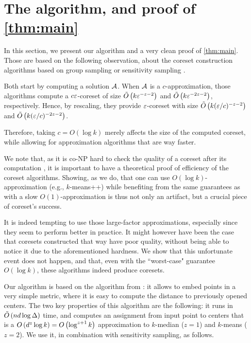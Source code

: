 \section{The algorithm, and proof of \cref{thm:main}}

In this section, we present our algorithm and a very clean proof of \cref{thm:main}. Those are based on the following observation, about the coreset construction algorithms based on group sampling \cite{stoc21} or sensitivity sampling \cite{FeldmanL11}. 

Both start by computing a solution $\mathcal A$. When $\mathcal A$ is a $c$-approximation, those algorithms compute a $c \varepsilon$-coreset of size $\tilde O\left( k \varepsilon^{-z-2}\right)$ and $\tilde O\left( k \varepsilon^{-2z -2}\right)$, respectively. Hence, by rescaling, they provide $\varepsilon$-coreset with size $\tilde O\left( k (\varepsilon/c)^{-z-2}\right)$ and $\tilde O\left( k (\varepsilon/c)^{-2z-2}\right)$. 

Therefore, taking $c = O(\log k)$ merely affects the size of the computed coreset, while allowing for approximation algorithms that are way faster.

We note that, as it is co-NP hard to check the quality of a coreset after its computation \cite{chrisESA}, it is important to have a theoretical proof of efficiency of the coreset algorithms. 
Showing, as we do, that one can use $O(\log k)$-approximation (e.g., $k$-means++) while benefiting from the same guarantees as with a slow $O(1)$-approximation is thus not only an artifact, but a crucial piece of coreset's success. 

It is indeed tempting to use those large-factor approximations, especially since they seem to perform better in practice. 
It might however have been the case that coresets constructed that way have poor quality, without being able to notice it due to the aforementioned hardness. 
We show that this unfortunate event does not happen, and that, even with the ``worst-case" guarantee $O(\log k)$, these algorithms indeed produce coresets.


Our algorithm is based on the \fkmeans algorithm from \cite{cohen2020fast}: it allows to embed points in a very simple metric,  where it is easy to compute the distance to previously opened centers. The two key properties of this algorithm are the following: it runs in $\tilde O\left( n d \log \Delta\right)$ time, and computes an assignment from input point to centers that is a $O\left( d^z \log k\right) = O\left(\log^{z+1} k\right)$ approximation to $k$-median ($z=1$) and $k$-means ($z=2$).
We use it, in combination with sensitivity sampling, as follows.


